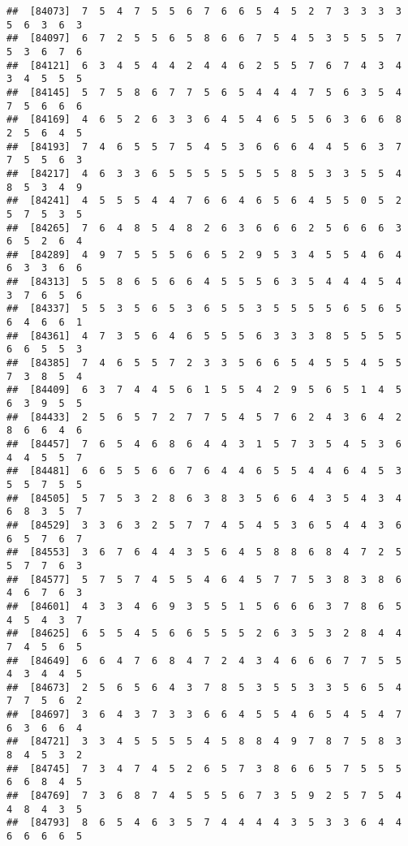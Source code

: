 \documentclass[
]{book}
\begin{document}
\begin{verbatim}
##  [84073]  7  5  4  7  5  5  6  7  6  6  5  4  5  2  7  3  3  3  3  5  6  3  6  3
##  [84097]  6  7  2  5  5  6  5  8  6  6  7  5  4  5  3  5  5  5  7  5  3  6  7  6
##  [84121]  6  3  4  5  4  4  2  4  4  6  2  5  5  7  6  7  4  3  4  3  4  5  5  5
##  [84145]  5  7  5  8  6  7  7  5  6  5  4  4  4  7  5  6  3  5  4  7  5  6  6  6
##  [84169]  4  6  5  2  6  3  3  6  4  5  4  6  5  5  6  3  6  6  8  2  5  6  4  5
##  [84193]  7  4  6  5  5  7  5  4  5  3  6  6  6  4  4  5  6  3  7  7  5  5  6  3
##  [84217]  4  6  3  3  6  5  5  5  5  5  5  5  8  5  3  3  5  5  4  8  5  3  4  9
##  [84241]  4  5  5  5  4  4  7  6  6  4  6  5  6  4  5  5  0  5  2  5  7  5  3  5
##  [84265]  7  6  4  8  5  4  8  2  6  3  6  6  6  2  5  6  6  6  3  6  5  2  6  4
##  [84289]  4  9  7  5  5  5  6  6  5  2  9  5  3  4  5  5  4  6  4  6  3  3  6  6
##  [84313]  5  5  8  6  5  6  6  4  5  5  5  6  3  5  4  4  4  5  4  3  7  6  5  6
##  [84337]  5  5  3  5  6  5  3  6  5  5  3  5  5  5  5  6  5  6  5  6  4  6  6  1
##  [84361]  4  7  3  5  6  4  6  5  5  5  6  3  3  3  8  5  5  5  5  6  6  5  5  3
##  [84385]  7  4  6  5  5  7  2  3  3  5  6  6  5  4  5  5  4  5  5  7  3  8  5  4
##  [84409]  6  3  7  4  4  5  6  1  5  5  4  2  9  5  6  5  1  4  5  6  3  9  5  5
##  [84433]  2  5  6  5  7  2  7  7  5  4  5  7  6  2  4  3  6  4  2  8  6  6  4  6
##  [84457]  7  6  5  4  6  8  6  4  4  3  1  5  7  3  5  4  5  3  6  4  4  5  5  7
##  [84481]  6  6  5  5  6  6  7  6  4  4  6  5  5  4  4  6  4  5  3  5  5  7  5  5
##  [84505]  5  7  5  3  2  8  6  3  8  3  5  6  6  4  3  5  4  3  4  6  8  3  5  7
##  [84529]  3  3  6  3  2  5  7  7  4  5  4  5  3  6  5  4  4  3  6  6  5  7  6  7
##  [84553]  3  6  7  6  4  4  3  5  6  4  5  8  8  6  8  4  7  2  5  5  7  7  6  3
##  [84577]  5  7  5  7  4  5  5  4  6  4  5  7  7  5  3  8  3  8  6  4  6  7  6  3
##  [84601]  4  3  3  4  6  9  3  5  5  1  5  6  6  6  3  7  8  6  5  4  5  4  3  7
##  [84625]  6  5  5  4  5  6  6  5  5  5  2  6  3  5  3  2  8  4  4  7  4  5  6  5
##  [84649]  6  6  4  7  6  8  4  7  2  4  3  4  6  6  6  7  7  5  5  4  3  4  4  5
##  [84673]  2  5  6  5  6  4  3  7  8  5  3  5  5  3  3  5  6  5  4  7  7  5  6  2
##  [84697]  3  6  4  3  7  3  3  6  6  4  5  5  4  6  5  4  5  4  7  6  3  6  6  4
##  [84721]  3  3  4  5  5  5  5  4  5  8  8  4  9  7  8  7  5  8  3  8  4  5  3  2
##  [84745]  7  3  4  7  4  5  2  6  5  7  3  8  6  6  5  7  5  5  5  6  6  8  4  5
##  [84769]  7  3  6  8  7  4  5  5  5  6  7  3  5  9  2  5  7  5  4  4  8  4  3  5
##  [84793]  8  6  5  4  6  3  5  7  4  4  4  4  3  5  3  3  6  4  4  6  6  6  6  5

\end{verbatim}
\end{document}
